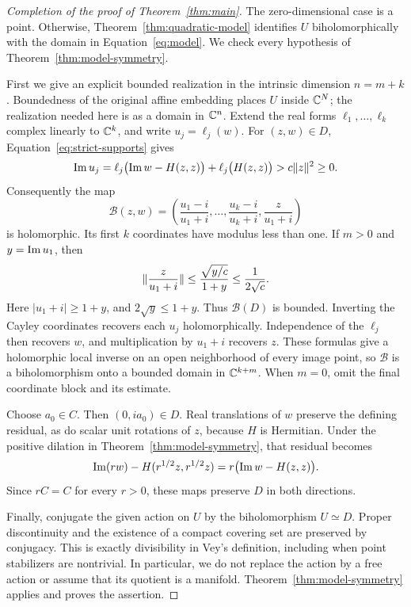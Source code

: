 \begin{proof}[Completion of the proof of Theorem~\ref{thm:main}]
The zero-dimensional case is a point.  Otherwise,
Theorem~\ref{thm:quadratic-model} identifies $U$ biholomorphically with
the domain in Equation~\eqref{eq:model}.  We check every hypothesis of
Theorem~\ref{thm:model-symmetry}.

First we give an explicit bounded realization in the intrinsic dimension
$n=m+k$.  Boundedness of the original affine embedding places $U$ inside
$\mathbb C^N$; the realization needed here is as a domain in $\mathbb C^n$.
Extend the real forms
$\ell_1,\ldots,\ell_k$ complex linearly to $\mathbb C^k$, and write
$u_j=\ell_j(w)$.  For $(z,w)\in D$, Equation~\eqref{eq:strict-supports}
gives
\[
 \operatorname{Im} u_j
 =\ell_j\bigl(\operatorname{Im} w-H(z,z)\bigr)+\ell_j\bigl(H(z,z)\bigr)
 >c\lVert z\rVert^{2}\geq0.
\]
Consequently the map
\begin{equation}\label{eq:bounded-realization}
 \mathcal B(z,w)=\left(
   \frac{u_1-i}{u_1+i},\ldots,\frac{u_k-i}{u_k+i},
   \frac{z}{u_1+i}\right)
\end{equation}
is holomorphic.  Its first $k$ coordinates have modulus less than one.
If $m>0$ and $y=\operatorname{Im} u_1$, then
\[
 \lVert \frac{z}{u_1+i}\rVert
 \leq\frac{\sqrt{y/c}}{1+y}
 \leq\frac{1}{2\sqrt c}.
\]
Here $|u_1+i|\geq1+y$, and $2\sqrt y\leq1+y$.
Thus $\mathcal B(D)$ is bounded.  Inverting the Cayley coordinates recovers
each $u_j$ holomorphically.  Independence of the $\ell_j$ then recovers
$w$, and multiplication by $u_1+i$ recovers $z$.  These formulas give a
holomorphic local inverse on an open neighborhood of every image point,
so $\mathcal B$ is a biholomorphism onto a bounded domain in $\mathbb C^{k+m}$.
When $m=0$, omit the final coordinate block and its estimate.

Choose $a_0\in C$.  Then $(0,ia_0)\in D$.  Real translations of $w$
preserve the defining residual, as do scalar unit rotations of $z$,
because $H$ is Hermitian.  Under the positive dilation in
Theorem~\ref{thm:model-symmetry}, that residual becomes
\[
 \operatorname{Im}(rw)-H(r^{1/2}z,r^{1/2}z)
 =r\bigl(\operatorname{Im} w-H(z,z)\bigr).
\]
Since $rC=C$ for every $r>0$, these maps preserve $D$ in both directions.

Finally, conjugate the given action on $U$ by the biholomorphism
$U\simeq D$.  Proper discontinuity and the existence of a compact covering
set are preserved by conjugacy.  This is exactly divisibility in Vey's
definition, including when point stabilizers are nontrivial.  In
particular, we do not replace the action by a free action or assume that
its quotient is a manifold.  Theorem~\ref{thm:model-symmetry} applies and
proves the assertion.
\end{proof}
